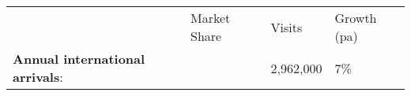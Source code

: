 \begin{tabular}[t]{p{2.95cm}>{\hfill}p{1.35cm}>{\hfill}p{1.1cm}>{\hfill}p{1.7cm}}
   & Market Share & Visits & Growth (pa) \\ 
 \textbf{Annual international arrivals}: &   & 2,962,000 & 7\% \\ 
  \end{tabular}
